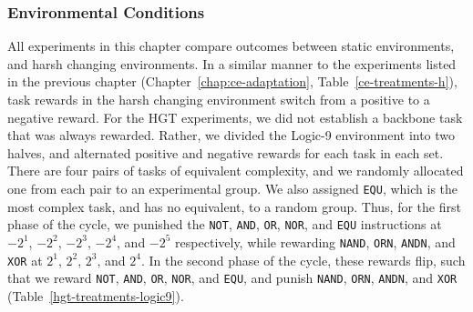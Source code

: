 \documentclass[PhD]{msu-thesis}
\begin{document}
\subsubsection{Environmental Conditions}
All experiments in this chapter compare outcomes between static environments, and harsh changing environments. In a similar manner to the experiments listed in the previous chapter (Chapter~\ref{chap:ce-adaptation}, Table~\ref{ce-treatments-h}), task rewards in the harsh changing environment switch from a positive to a negative reward. For the HGT experiments, we did not establish a backbone task that was always rewarded. Rather, we divided the Logic-9 environment into two halves, and alternated positive and negative rewards for each task in each set. There are four pairs of tasks of equivalent complexity, and we randomly allocated one from each pair to an experimental group. We also assigned \texttt{EQU}, which is the most complex task, and has no equivalent, to a random group. Thus, for the first phase of the cycle, we punished the \texttt{NOT}, \texttt{AND}, \texttt{OR}, \texttt{NOR}, and \texttt{EQU} instructions at $-2^1$, $-2^2$, $-2^3$, $-2^4$, and $-2^5$ respectively, while rewarding \texttt{NAND}, \texttt{ORN}, \texttt{ANDN}, and \texttt{XOR} at $2^1$, $2^2$, $2^3$, and $2^4$. In the second phase of the cycle, these rewards flip, such that we reward \texttt{NOT}, \texttt{AND}, \texttt{OR}, \texttt{NOR}, and \texttt{EQU}, and punish \texttt{NAND}, \texttt{ORN}, \texttt{ANDN}, and \texttt{XOR} (Table~\ref{hgt-treatments-logic9}).
\end{document}
